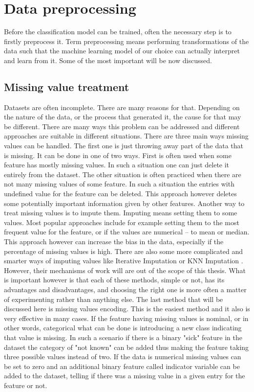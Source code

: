 \documentclass[a4paper,twoside,12pt]{book}
\begin{document}
\section{Data preprocessing}

Before the classification model can be trained, often the necessary step is to firstly preprocess it. Term preprocessing means performing transformations of the data such that the machine learning model of our choice can actually interpret and learn from it. Some of the most important will be now discussed.

\subsection{Missing value treatment}

Datasets are often incomplete. There are many reasons for that. Depending on the nature of the data, or the process that generated it, the cause for that may be different. There are many ways this problem can be addressed and different approaches are suitable in different situations.
There are three main ways missing values can be handled. The first one is just throwing away part of the data that is missing. It can be done in one of two ways. First is often used when some feature has mostly missing values. In such a situation one can just delete it entirely from the dataset. The other situation is often practiced when there are not many missing values of some feature. In such a situation the entries with undefined value for the feature can be deleted. This approach however deletes some potentially important information given by other features.
Another way to treat missing values is to impute them. Imputing means setting them to some values. Most popular approaches include for example setting them to the most frequent value for the feature, or if the values are numerical -- to mean or median. This approach however can increase the bias in the data, especially if the percentage of missing values is high. 
There are also some more complicated and smarter ways of imputing values like Iterative Imputation \cite{liu2013comparison} or KNN Imputation \cite{beretta2016nearest}. However, their mechanisms of work will are out of the scope of this thesis.
What is important however is that each of these methods, simple or not, has its advantages and disadvantages, and choosing the right one is more often a matter of experimenting rather than anything else.
The last method that will be discussed here is missing values encoding. This is the easiest method and it also is very effective in many cases. If the feature having missing values is nominal, or in other words, categorical what can be done is introducing a new class indicating that value is missing. In such a scenario if there is a binary "sick" feature in the dataset the category of "not known" can be added thus making the feature taking three possible values instead of two. If the data is numerical missing values can be set to zero and an additional binary feature called indicator variable can be added to the dataset, telling if there was a missing value in a given entry for the feature or not.
\end{document}
